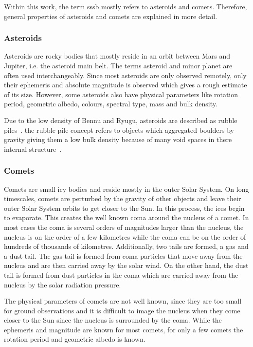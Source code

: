Within this work, the term \gls{sssb} mostly refers to asteroids and comets. Therefore, general properties of asteroids and comets are explained in more detail.

\subsubsection{Asteroids}
Asteroids are rocky bodies that mostly reside in an orbit between Mars and Jupiter, i.e. the asteroid main belt. The terms asteroid and minor planet are often used interchangeably. Since most asteroids are only observed remotely, only their ephemeris and absolute magnitude is observed which gives a rough estimate of its size. However, some asteroids also have physical parameters like rotation period, geometric albedo, colours, spectral type, mass and bulk density.

Due to the low density of Bennu and Ryugu, asteroids are described as rubble piles~\cite{Chesley2014OrbitBennu, Watanabe2019Hayabusa2Pile}. the rubble pile concept refers to objects which aggregated boulders by gravity giving them a low bulk density because of many void spaces in there internal structure~\cite{Richardson2002GravitationalEvolution}.

\subsubsection{Comets}
Comets are small icy bodies and reside mostly in the outer Solar System. On long timescales, comets are perturbed by the gravity of other objects and leave their outer Solar System orbits to get closer to the Sun. In this process, the ices begin to evaporate. This creates the well known coma around the nucleus of a comet. In most cases the coma is several orders of magnitudes larger than the nucleus, the nucleus is on the order of a few kilometres while the coma can be on the order of hundreds of thousands of kilometres. Additionally, two tails are formed, a gas and a dust tail. The gas tail is formed from coma particles that move away from the nucleus and are then carried away by the solar wind. On the other hand, the dust tail is formed from dust particles in the coma which are carried away from the nucleus by the solar radiation pressure.

The physical parameters of comets are not well known, since they are too small for ground observations and it is difficult to image the nucleus when they come closer to the Sun since the nucleus is surrounded by the coma. While the ephemeris and magnitude are known for most comets, for only a few comets the rotation period and geometric albedo is known.

